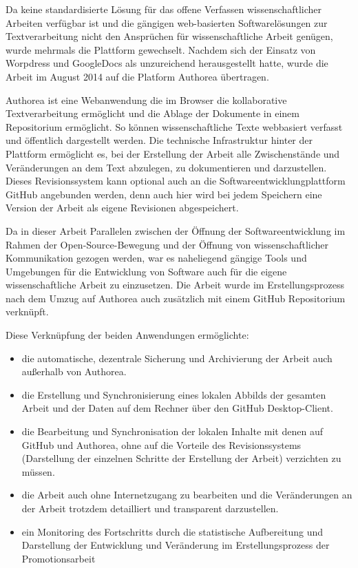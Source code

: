 Da keine standardisierte Lösung für das offene Verfassen wissenschaftlicher Arbeiten verfügbar ist und die gängigen web-basierten Softwarelösungen zur Textverarbeitung nicht den Ansprüchen für wissenschaftliche Arbeit genügen, wurde mehrmals die Plattform gewechselt. Nachdem sich der Einsatz von Worpdress und GoogleDocs als unzureichend herausgestellt hatte, wurde die Arbeit im August 2014 auf die Platform Authorea übertragen.

Authorea ist eine Webanwendung die im Browser die kollaborative Textverarbeitung ermöglicht und die Ablage der Dokumente in einem Repositorium ermöglicht. So können wissenschaftliche Texte webbasiert verfasst und öffentlich dargestellt werden. Die technische Infrastruktur hinter der Plattform ermöglicht es, bei der Erstellung der Arbeit alle Zwischenstände und Veränderungen an dem Text abzulegen, zu dokumentieren und darzustellen. Dieses Revisionssystem kann optional auch an die Softwareentwicklungplattform GitHub angebunden werden, denn auch hier wird bei jedem Speichern eine Version der Arbeit als eigene Revisionen abgespeichert.

Da in dieser Arbeit Parallelen zwischen der Öffnung der Softwareentwicklung im Rahmen der Open-Source-Bewegung und der Öffnung von wissenschaftlicher Kommunikation gezogen werden, war es naheliegend gängige Tools und Umgebungen für die Entwicklung von Software auch für die eigene wissenschaftliche Arbeit zu einzusetzen. Die Arbeit wurde im Erstellungsprozess nach dem Umzug auf Authorea auch zusätzlich mit einem GitHub Repositorium verknüpft.

Diese Verknüpfung der beiden Anwendungen ermöglichte:
\begin{itemize}
\item die automatische, dezentrale Sicherung und Archivierung der Arbeit auch außerhalb von Authorea.
\item die Erstellung und Synchronisierung eines lokalen Abbilds der gesamten Arbeit und der Daten auf dem Rechner über den GitHub Desktop-Client.
\item die Bearbeitung und Synchronisation der lokalen Inhalte mit denen auf GitHub und Authorea, ohne auf die Vorteile des Revisionssystems (Darstellung der einzelnen Schritte der Erstellung der Arbeit) verzichten zu müssen.
\item die Arbeit auch ohne Internetzugang zu bearbeiten und die Veränderungen an der Arbeit trotzdem detailliert und transparent darzustellen.
\item ein Monitoring des Fortschritts durch die statistische Aufbereitung und Darstellung der Entwicklung und Veränderung im Erstellungsprozess der Promotionsarbeit
\end{itemize}

